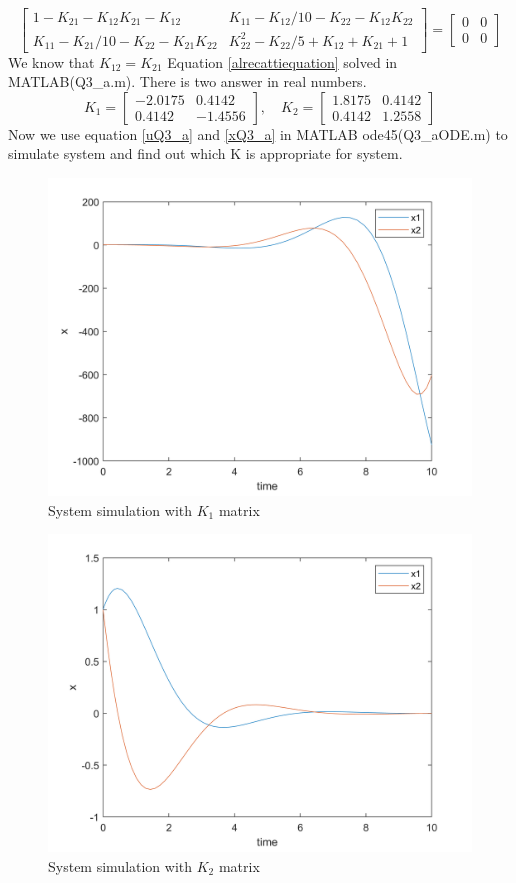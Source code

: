 $$
 \begin{bmatrix}\label{alrecattiequation}
	1 - K_{21} - K_{12}K_{21} - K_{12} &  K_{11} - K_{12}/10 - K_{22} - K_{12}K_{22} \\
	K_{11} - K_{21}/10 - K_{22} - K_{21}K_{22} & K_{22}^2 - K_{22}/5 + K_{12} + K_{21} + 1
\end{bmatrix} 
= \begin{bmatrix}
	0 & 0\\0 &0
\end{bmatrix}
$$
We know that $K_{12} = K_{21}$
Equation \ref{alrecattiequation} solved in MATLAB(Q3\_a.m).
There is two answer in real numbers.
$$K_1 = \begin{bmatrix} 
	-2.0175&  0.4142\\
	0.4142& -1.4556
\end{bmatrix}, \quad K_2 = \begin{bmatrix} 
1.8175&  0.4142\\
0.4142& 1.2558
\end{bmatrix}$$
Now we use equation \ref{uQ3_a} and \ref{xQ3_a} in MATLAB ode45(Q3\_aODE.m) to simulate system and find out which K is appropriate for system.
\begin{figure}[H]
	\caption{System simulation with $K_1$ matrix}
	\centering
	\includegraphics[width=12cm]{../Code/Q3/figures/K1ODE.png}
\end{figure}
\begin{figure}[H]
	\caption{System simulation with $K_2$ matrix}\label{fQ3_ax}
	\centering
	\includegraphics[width=12cm]{../Code/Q3/figures/K2ODE.png}
\end{figure}

